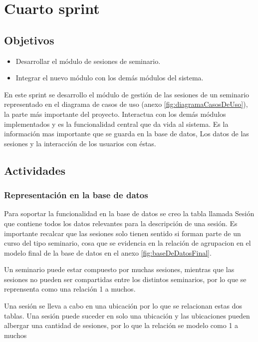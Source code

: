 \section{Cuarto sprint} %
\label{sec:cuarto_sprint}

\subsection{Objetivos}

\begin{itemize}
	\item Desarrollar el módulo de sesiones de seminario.
	\item Integrar el nuevo módulo con los demás módulos del sistema.
\end{itemize}

En este sprint se desarrollo el módulo de gestión de las sesiones de un seminario representado en el diagrama de casos de uso (anexo \ref{fig:diagramaCasosDeUso}), la parte más importante del proyecto. Interactua con los demás módulos implementados y es la funcionalidad central que da vida al sistema. Es la información mas importante que se guarda en la base de datos, Los datos de las sesiones y la interacción de los usuarios con éstas.

\subsection{Actividades} %
\label{sub:actividades4}

\subsubsection{Representación en la base de datos}

Para soportar la funcionalidad en la base de datos se creo la tabla llamada Sesión que contiene todos los datos relevantes para la descripción de una sesión. Es importante recalcar que las sesiones solo tienen sentido si forman parte de un curso del tipo seminario, cosa que se evidencia en la relación de agrupacion en el modelo final de la base de datos en el anexo \ref{fig:baseDeDatosFinal}. 

Un seminario puede estar compuesto por muchas sesiones, mientras que las sesiones no pueden ser compartidas entre los distintos seminarios, por lo que se reprensenta como una relación 1 a muchos. 

Una sesión se lleva a cabo en una ubicación por lo que se relacionan estas dos tablas. Una sesión puede suceder en solo una ubicación y las ubicaciones pueden albergar una cantidad de sesiones, por lo que la relación se modelo como 1 a muchos

